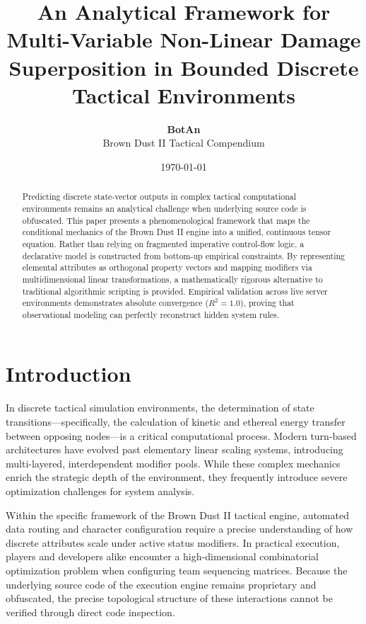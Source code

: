 \documentclass[twocolumn,10pt]{article}
\title{\textbf{An Analytical Framework for Multi-Variable Non-Linear Damage Superposition in Bounded Discrete Tactical Environments}}
\author{\textbf{BotAn} \\ \small Brown Dust II Tactical Compendium}
\date{\today}
\begin{document}
\raggedbottom

\maketitle

\begin{abstract}
Predicting discrete state-vector outputs in complex tactical computational environments remains an analytical challenge when underlying source code is obfuscated. This paper presents a phenomenological framework that maps the conditional mechanics of the Brown Dust II engine into a unified, continuous tensor equation. Rather than relying on fragmented imperative control-flow logic, a declarative model is constructed from bottom-up empirical constraints. By representing elemental attributes as orthogonal property vectors and mapping modifiers via multidimensional linear transformations, a mathematically rigorous alternative to traditional algorithmic scripting is provided. Empirical validation across live server environments demonstrates absolute convergence ($R^2 = 1.0$), proving that observational modeling can perfectly reconstruct hidden system rules.
\end{abstract}

\section{Introduction}
In discrete tactical simulation environments, the determination of state transitions—specifically, the calculation of kinetic and ethereal energy transfer between opposing nodes—is a critical computational process. Modern turn-based architectures have evolved past elementary linear scaling systems, introducing multi-layered, interdependent modifier pools. While these complex mechanics enrich the strategic depth of the environment, they frequently introduce severe optimization challenges for system analysis.

Within the specific framework of the Brown Dust II tactical engine, automated data routing and character configuration require a precise understanding of how discrete attributes scale under active status modifiers. In practical execution, players and developers alike encounter a high-dimensional combinatorial optimization problem when configuring team sequencing matrices. Because the underlying source code of the execution engine remains proprietary and obfuscated, the precise topological structure of these interactions cannot be verified through direct code inspection.
\end{document}
